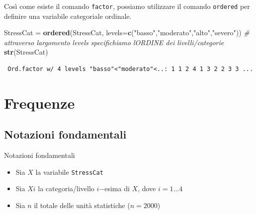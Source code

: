\documentclass[
  ignorenonframetext,
  compress, aspectratio=149]{beamer}
\newenvironment{Shaded}{\begin{snugshade}}{\end{snugshade}}
\newcommand{\AttributeTok}[1]{\textcolor[rgb]{0.13,0.29,0.53}{#1}}
\newcommand{\CommentTok}[1]{\textcolor[rgb]{0.56,0.35,0.01}{\textit{#1}}}
\newcommand{\FunctionTok}[1]{\textcolor[rgb]{0.13,0.29,0.53}{\textbf{#1}}}
\newcommand{\NormalTok}[1]{#1}
\newcommand{\OtherTok}[1]{\textcolor[rgb]{0.56,0.35,0.01}{#1}}
\newcommand{\SpecialCharTok}[1]{\textcolor[rgb]{0.81,0.36,0.00}{\textbf{#1}}}
\newcommand{\StringTok}[1]{\textcolor[rgb]{0.31,0.60,0.02}{#1}}
\begin{document}
\begin{frame}[fragile]
Così come esiste il comando \texttt{factor}, possiamo utilizzare il
comando \texttt{ordered} per definire una variabile categoriale
ordinale.

\begin{Shaded}
\begin{Highlighting}[]
\NormalTok{StressCat }\OtherTok{=} \FunctionTok{ordered}\NormalTok{(StressCat, }
           \AttributeTok{levels=}\FunctionTok{c}\NormalTok{(}\StringTok{"basso"}\NormalTok{,}\StringTok{"moderato"}\NormalTok{,}\StringTok{"alto"}\NormalTok{,}\StringTok{"severo"}\NormalTok{))}
\CommentTok{\# attraverso l\textquotesingle{}argomento levels specifichiamo l\textquotesingle{}ORDINE dei livelli/categorie}
\FunctionTok{str}\NormalTok{(StressCat)}
\end{Highlighting}
\end{Shaded}

\begin{verbatim}
 Ord.factor w/ 4 levels "basso"<"moderato"<..: 1 1 2 4 1 3 2 2 3 3 ...
\end{verbatim}

\begin{Shaded}
\end{Shaded}
\end{frame}

\section{Frequenze}\label{frequenze}

\subsection{Notazioni fondamentali}\label{notazioni-fondamentali}

\begin{frame}[fragile]{Notazioni fondamentali}
\begin{itemize}
\item
  Sia \(X\) la variabile \texttt{StressCat}
\item
  Sia \(Xi\) la categoria/livello \(i\)−esima di \(X\), dove
  \(i = 1 \dots 4\)
\item
  Sia \(n\) il totale delle unità statistiche (\(n = 2000\))
\end{itemize}
\end{frame}
\end{document}
